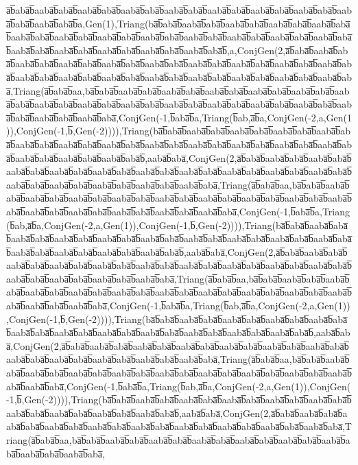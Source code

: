 a̅b̅aba̅b̅aaba̅b̅aba̅b̅aaba̅b̅aba̅b̅aaba̅b̅aba̅b̅aaba̅b̅aba̅b̅aaba̅b̅aba̅b̅aaba̅b̅aba̅b̅aaba̅b̅aba̅b̅aaba̅b̅aba̅b̅aaba̅b̅aba̅b̅a,Gen(1),Triang(ba̅b̅aba̅b̅aaba̅b̅aba̅b̅aaba̅b̅aba̅b̅aaba̅b̅aba̅b̅aaba̅b̅aba̅b̅aaba̅b̅aba̅b̅aaba̅b̅aba̅b̅aaba̅b̅aba̅b̅aaba̅b̅aba̅b̅aaba̅b̅aba̅b̅aaba̅b̅aba̅b̅aaba̅b̅aba̅b̅aaba̅b̅aba̅b̅aaba̅b̅aba̅b̅aaba̅b̅aba̅b̅aaba̅b̅aba̅b̅aaba̅b̅aba̅b̅aaba̅b̅aba̅b̅,a,ConjGen(2,a̅b̅aba̅b̅aaba̅b̅aba̅b̅aaba̅b̅aba̅b̅aaba̅b̅aba̅b̅aaba̅b̅aba̅b̅aaba̅b̅aba̅b̅aaba̅b̅aba̅b̅aaba̅b̅aba̅b̅aaba̅b̅aba̅b̅aaba̅b̅aba̅b̅aaba̅b̅aba̅b̅aaba̅b̅aba̅b̅aaba̅b̅aba̅b̅aaba̅b̅aba̅b̅aaba̅b̅aba̅b̅aaba̅b̅aba̅b̅aaba̅b̅aba̅b̅aaba̅b̅aba̅,Triang(a̅b̅aba̅b̅aa,ba̅b̅aba̅b̅aaba̅b̅aba̅b̅aaba̅b̅aba̅b̅aaba̅b̅aba̅b̅aaba̅b̅aba̅b̅aaba̅b̅aba̅b̅aaba̅b̅aba̅b̅aaba̅b̅aba̅b̅aaba̅b̅aba̅b̅aaba̅b̅aba̅b̅aaba̅b̅aba̅b̅aaba̅b̅aba̅b̅aaba̅b̅aba̅b̅aaba̅b̅aba̅b̅aaba̅b̅aba̅b̅aaba̅b̅aba̅b̅aaba̅b̅aba̅,ConjGen(-1,b̅aba̅b̅a,Triang(b̅ab,a̅b̅a,ConjGen(-2,a,Gen(1)),ConjGen(-1,b̅,Gen(-2)))),Triang(ba̅b̅aba̅b̅aaba̅b̅aba̅b̅aaba̅b̅aba̅b̅aaba̅b̅aba̅b̅aaba̅b̅aba̅b̅aaba̅b̅aba̅b̅aaba̅b̅aba̅b̅aaba̅b̅aba̅b̅aaba̅b̅aba̅b̅aaba̅b̅aba̅b̅aaba̅b̅aba̅b̅aaba̅b̅aba̅b̅aaba̅b̅aba̅b̅aaba̅b̅aba̅b̅aaba̅b̅aba̅b̅aaba̅b̅aba̅b̅,aaba̅b̅aba̅,ConjGen(2,a̅b̅aba̅b̅aaba̅b̅aba̅b̅aaba̅b̅aba̅b̅aaba̅b̅aba̅b̅aaba̅b̅aba̅b̅aaba̅b̅aba̅b̅aaba̅b̅aba̅b̅aaba̅b̅aba̅b̅aaba̅b̅aba̅b̅aaba̅b̅aba̅b̅aaba̅b̅aba̅b̅aaba̅b̅aba̅b̅aaba̅b̅aba̅b̅aaba̅b̅aba̅b̅aaba̅b̅aba̅b̅aaba̅b̅aba̅,Triang(a̅b̅aba̅b̅aa,ba̅b̅aba̅b̅aaba̅b̅aba̅b̅aaba̅b̅aba̅b̅aaba̅b̅aba̅b̅aaba̅b̅aba̅b̅aaba̅b̅aba̅b̅aaba̅b̅aba̅b̅aaba̅b̅aba̅b̅aaba̅b̅aba̅b̅aaba̅b̅aba̅b̅aaba̅b̅aba̅b̅aaba̅b̅aba̅b̅aaba̅b̅aba̅b̅aaba̅b̅aba̅b̅aaba̅b̅aba̅,ConjGen(-1,b̅aba̅b̅a,Triang(b̅ab,a̅b̅a,ConjGen(-2,a,Gen(1)),ConjGen(-1,b̅,Gen(-2)))),Triang(ba̅b̅aba̅b̅aaba̅b̅aba̅b̅aaba̅b̅aba̅b̅aaba̅b̅aba̅b̅aaba̅b̅aba̅b̅aaba̅b̅aba̅b̅aaba̅b̅aba̅b̅aaba̅b̅aba̅b̅aaba̅b̅aba̅b̅aaba̅b̅aba̅b̅aaba̅b̅aba̅b̅aaba̅b̅aba̅b̅aaba̅b̅aba̅b̅aaba̅b̅aba̅b̅,aaba̅b̅aba̅,ConjGen(2,a̅b̅aba̅b̅aaba̅b̅aba̅b̅aaba̅b̅aba̅b̅aaba̅b̅aba̅b̅aaba̅b̅aba̅b̅aaba̅b̅aba̅b̅aaba̅b̅aba̅b̅aaba̅b̅aba̅b̅aaba̅b̅aba̅b̅aaba̅b̅aba̅b̅aaba̅b̅aba̅b̅aaba̅b̅aba̅b̅aaba̅b̅aba̅b̅aaba̅b̅aba̅,Triang(a̅b̅aba̅b̅aa,ba̅b̅aba̅b̅aaba̅b̅aba̅b̅aaba̅b̅aba̅b̅aaba̅b̅aba̅b̅aaba̅b̅aba̅b̅aaba̅b̅aba̅b̅aaba̅b̅aba̅b̅aaba̅b̅aba̅b̅aaba̅b̅aba̅b̅aaba̅b̅aba̅b̅aaba̅b̅aba̅b̅aaba̅b̅aba̅b̅aaba̅b̅aba̅,ConjGen(-1,b̅aba̅b̅a,Triang(b̅ab,a̅b̅a,ConjGen(-2,a,Gen(1)),ConjGen(-1,b̅,Gen(-2)))),Triang(ba̅b̅aba̅b̅aaba̅b̅aba̅b̅aaba̅b̅aba̅b̅aaba̅b̅aba̅b̅aaba̅b̅aba̅b̅aaba̅b̅aba̅b̅aaba̅b̅aba̅b̅aaba̅b̅aba̅b̅aaba̅b̅aba̅b̅aaba̅b̅aba̅b̅aaba̅b̅aba̅b̅aaba̅b̅aba̅b̅,aaba̅b̅aba̅,ConjGen(2,a̅b̅aba̅b̅aaba̅b̅aba̅b̅aaba̅b̅aba̅b̅aaba̅b̅aba̅b̅aaba̅b̅aba̅b̅aaba̅b̅aba̅b̅aaba̅b̅aba̅b̅aaba̅b̅aba̅b̅aaba̅b̅aba̅b̅aaba̅b̅aba̅b̅aaba̅b̅aba̅b̅aaba̅b̅aba̅,Triang(a̅b̅aba̅b̅aa,ba̅b̅aba̅b̅aaba̅b̅aba̅b̅aaba̅b̅aba̅b̅aaba̅b̅aba̅b̅aaba̅b̅aba̅b̅aaba̅b̅aba̅b̅aaba̅b̅aba̅b̅aaba̅b̅aba̅b̅aaba̅b̅aba̅b̅aaba̅b̅aba̅b̅aaba̅b̅aba̅,ConjGen(-1,b̅aba̅b̅a,Triang(b̅ab,a̅b̅a,ConjGen(-2,a,Gen(1)),ConjGen(-1,b̅,Gen(-2)))),Triang(ba̅b̅aba̅b̅aaba̅b̅aba̅b̅aaba̅b̅aba̅b̅aaba̅b̅aba̅b̅aaba̅b̅aba̅b̅aaba̅b̅aba̅b̅aaba̅b̅aba̅b̅aaba̅b̅aba̅b̅aaba̅b̅aba̅b̅aaba̅b̅aba̅b̅,aaba̅b̅aba̅,ConjGen(2,a̅b̅aba̅b̅aaba̅b̅aba̅b̅aaba̅b̅aba̅b̅aaba̅b̅aba̅b̅aaba̅b̅aba̅b̅aaba̅b̅aba̅b̅aaba̅b̅aba̅b̅aaba̅b̅aba̅b̅aaba̅b̅aba̅b̅aaba̅b̅aba̅,Triang(a̅b̅aba̅b̅aa,ba̅b̅aba̅b̅aaba̅b̅aba̅b̅aaba̅b̅aba̅b̅aaba̅b̅aba̅b̅aaba̅b̅aba̅b̅aaba̅b̅aba̅b̅aaba̅b̅aba̅b̅aaba̅b̅aba̅b̅aaba̅b̅aba̅,